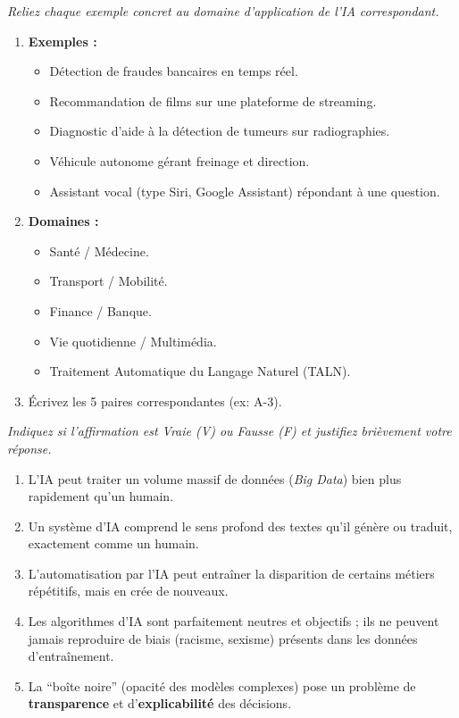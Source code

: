 \documentclass[11pt]{article}
\begin{document}
\begin{exercice}
\emph{Reliez chaque exemple concret au domaine d'application de l'IA correspondant.}
\begin{enumerate}
    \item \textbf{Exemples :}
    \begin{itemize}
        \item[A.] Détection de fraudes bancaires en temps réel.
        \item[B.] Recommandation de films sur une plateforme de streaming.
        \item[C.] Diagnostic d'aide à la détection de tumeurs sur radiographies.
        \item[D.] Véhicule autonome gérant freinage et direction.
        \item[E.] Assistant vocal (type Siri, Google Assistant) répondant à une question.
    \end{itemize}
    \item \textbf{Domaines :}
    \begin{itemize}
        \item[1.] Santé / Médecine.
        \item[2.] Transport / Mobilité.
        \item[3.] Finance / Banque.
        \item[4.] Vie quotidienne / Multimédia.
        \item[5.] Traitement Automatique du Langage Naturel (TALN).
    \end{itemize}
    \item Écrivez les 5 paires correspondantes (ex: A-3).
\end{enumerate}
\end{exercice}

\begin{exercice}
\emph{Indiquez si l'affirmation est Vraie (V) ou Fausse (F) et justifiez brièvement votre réponse.}
\begin{enumerate}
    \item L'IA peut traiter un volume massif de données (\textit{Big Data}) bien plus rapidement qu'un humain.
    \item Un système d'IA comprend le sens profond des textes qu'il génère ou traduit, exactement comme un humain.
    \item L'automatisation par l'IA peut entraîner la disparition de certains métiers répétitifs, mais en crée de nouveaux.
    \item Les algorithmes d'IA sont parfaitement neutres et objectifs ; ils ne peuvent jamais reproduire de biais (racisme, sexisme) présents dans les données d'entraînement.
    \item La ``boîte noire'' (opacité des modèles complexes) pose un problème de \textbf{transparence} et d'\textbf{explicabilité} des décisions.
\end{enumerate}
\end{exercice}
\end{document}
